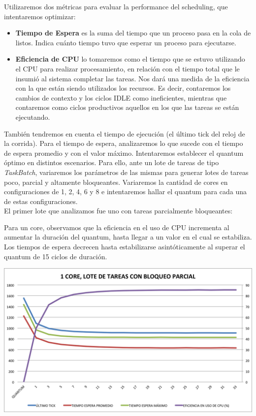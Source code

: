 \noindent
Utilizaremos dos métricas para evaluar la performance del scheduling, que intentaremos optimizar:
\begin{itemize}
	\item \textbf{Tiempo de Espera} es la suma del tiempo que un proceso pasa en la cola de listos. Indica cuánto tiempo tuvo que esperar un proceso para ejecutarse.
	\item \textbf{Eficiencia de CPU} lo tomaremos como el tiempo que se estuvo utilizando el CPU para realizar procesamiento, en relación con el tiempo total que le insumió al sistema completar las tareas. Nos dará una medida de la eficiencia con la que están siendo utilizados los recursos. Es decir, contaremos los cambios de contexto y los ciclos IDLE como ineficientes, mientras que contaremos como ciclos productivos aquellos en los que las tareas se están ejecutando.
\end{itemize}

Tambi\'en tendremos en cuenta el tiempo de ejecuci\'on (el \'ultimo tick del reloj de la corrida). Para el tiempo de espera, analizaremos lo que sucede con el tiempo de espera promedio y con el valor m\'aximo. Intentaremos establecer el quantum \'optimo en distintos escenarios. Para ello, ante un lote de tareas de tipo \textit{TaskBatch}, variaremos los par\'ametros de las mismas para generar lotes de tareas poco, parcial y altamente bloqueantes. Variaremos la cantidad de cores en configuraciones de 1, 2, 4, 6 y 8 e intentaremos hallar el quantum para cada una de estas configuraciones. \\

El primer lote que analizamos fue uno con tareas parcialmente bloqueantes:


Para un core, observamos que la eficiencia en el uso de CPU incrementa al aumentar la duraci\'on del quantum, hasta llegar a un valor en el cual se estabiliza. Los tiempos de espera decrecen hasta estabilizarse asint\'oticamente al superar el quantum de 15 ciclos de duraci\'on.

\begin{center}
	\includegraphics[scale=0.4]{graficos/1core_loteNormal.png}
\end{center}

